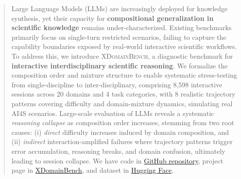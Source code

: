 \documentclass{article}
\begin{document}
\begin{abstract}
Large Language Models (LLMs) are increasingly deployed for knowledge synthesis, yet their capacity for \textbf{compositional generalization in scientific knowledge} remains under-characterized.
Existing benchmarks primarily focus on single-turn restricted scenarios, failing to capture the capability boundaries exposed by real-world interactive scientific workflows.
To address this, we introduce \textsc{XDomainBench}, a diagnostic benchmark for \textbf{interactive interdisciplinary scientific reasoning}.
We formalize the composition order and mixture structure to enable systematic stress-testing from single-discipline to inter-disciplinary, comprising 8,598 interactive sessions across 20 domains and 4 task categories, with 8 realistic trajectory patterns covering difficulty and domain-mixture dynamics, simulating real AI4S scenarios.
Large-scale evaluation of LLMs reveals a systematic \emph{reasoning collapse} as composition order increases, stemming from two root causes: (i) \emph{direct} difficulty increases induced by domain composition, and (ii) \emph{indirect} interaction-amplified failures where trajectory patterns trigger error accumulation, reasoning breaks, and domain confusion, ultimately leading to session collapse.
We have code in \href{https://github.com/GongZhiren/XDomainBench.git}{GitHub repository}, project page in \href{https://gongzhiren.github.io/XDomainBench-website/}{XDomainBench}, and dataset in \href{https://huggingface.co/datasets/ZHIREN001/XDomainBench}{Hugging Face}.
\vspace{-2mm}
\end{abstract}


\end{document}
